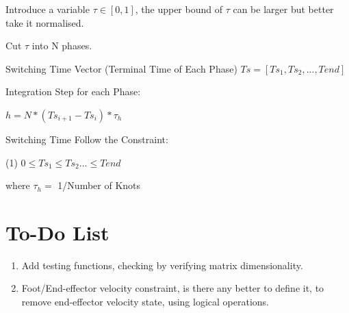 \documentclass[a4paper,10pt]{article}
\begin{document}
Introduce a variable $\tau \in [0,1]$, the upper bound of $\tau$ can be larger but better take it normalised.

Cut $\tau$ into N phases.

Switching Time Vector (Terminal Time of Each Phase)
$Ts = [Ts_1, Ts_2, ... , Tend]$

Integration Step for each Phase:

$h = N*(Ts_{i+1}-Ts_{i})*\tau_h$

Switching Time Follow the Constraint:

(1) $0 \leq Ts_1 \leq Ts_2 ... \leq Tend$

where $\tau_h = $ 1/Number of Knots


\section{To-Do List}
\begin{enumerate}
	\item Add testing functions, checking by verifying matrix dimensionality.
	\item Foot/End-effector velocity constraint, is there any better to define it, to remove end-effector velocity state, using logical operations.
\end{enumerate}

\medskip
\newpage

\end{document}
